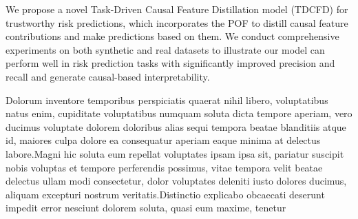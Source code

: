 \documentclass[letterpaper]{article} %
\theoremstyle{definition}
\theoremstyle{remark}
\begin{document}
We propose a novel Task-Driven Causal Feature Distillation model (TDCFD) for trustworthy risk predictions, which incorporates the POF to distill causal feature contributions and make predictions based on them. We conduct comprehensive experiments on both synthetic and real datasets to illustrate our model can perform well in risk prediction tasks with significantly improved precision and recall and generate causal-based interpretability.




Dolorum inventore temporibus perspiciatis quaerat nihil libero, voluptatibus natus enim, cupiditate voluptatibus numquam soluta dicta tempore aperiam, vero ducimus voluptate dolorem doloribus alias sequi tempora beatae blanditiis atque id, maiores culpa dolore ea consequatur aperiam eaque minima at delectus labore.Magni hic soluta eum repellat voluptates ipsam ipsa sit, pariatur suscipit nobis voluptas et tempore perferendis possimus, vitae tempora velit beatae delectus ullam modi consectetur, dolor voluptates deleniti iusto dolores ducimus, aliquam excepturi nostrum veritatis.Distinctio explicabo obcaecati deserunt impedit error nesciunt dolorem soluta, quasi eum maxime, tenetur

\end{document}
